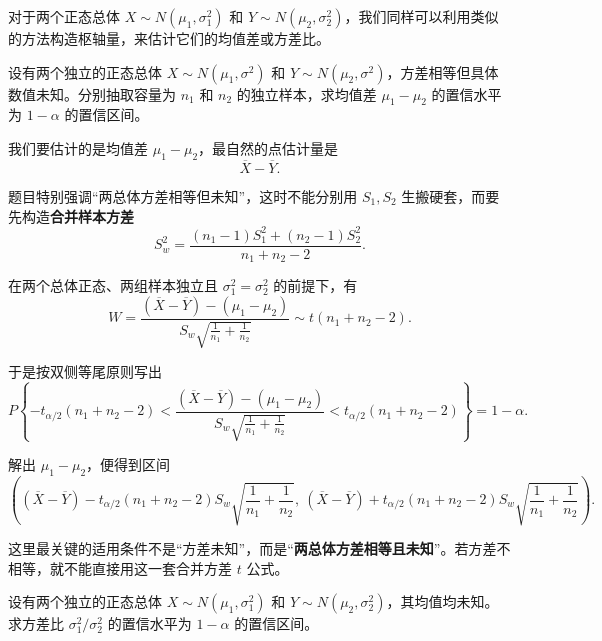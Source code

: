﻿\documentclass[lang=cn,11pt]{elegantbook}
\begin{document}
对于两个正态总体 $X \sim N(\mu_1, \sigma_1^2)$ 和 $Y \sim N(\mu_2, \sigma_2^2)$，我们同样可以利用类似的方法构造枢轴量，来估计它们的均值差或方差比。

\begin{exercise} \label{ex:ci_diff_mu_unknown_var}
设有两个独立的正态总体 $X \sim N(\mu_1, \sigma^2)$ 和 $Y \sim N(\mu_2, \sigma^2)$，方差相等但具体数值未知。分别抽取容量为 $n_1$ 和 $n_2$ 的独立样本，求均值差 $\mu_1-\mu_2$ 的置信水平为 $1-\alpha$ 的置信区间。
\end{exercise}

\begin{solution}
我们要估计的是均值差 \(\mu_1-\mu_2\)，最自然的点估计量是
\[
\overline{X}-\overline{Y}.
\]

题目特别强调“两总体方差相等但未知”，这时不能分别用 \(S_1,S_2\) 生搬硬套，而要先构造\textbf{合并样本方差}
\[
S_w^2=\frac{(n_1-1)S_1^2+(n_2-1)S_2^2}{n_1+n_2-2}.
\]

在两个总体正态、两组样本独立且 \(\sigma_1^2=\sigma_2^2\) 的前提下，有
\[
W=\frac{(\overline{X}-\overline{Y})-(\mu_1-\mu_2)}{S_w\sqrt{\frac{1}{n_1}+\frac{1}{n_2}}}\sim t(n_1+n_2-2).
\]

于是按双侧等尾原则写出
\[
P\left\{-t_{\alpha/2}(n_1+n_2-2)<\frac{(\overline{X}-\overline{Y})-(\mu_1-\mu_2)}{S_w\sqrt{\frac{1}{n_1}+\frac{1}{n_2}}}<t_{\alpha/2}(n_1+n_2-2)\right\}=1-\alpha.
\]

解出 \(\mu_1-\mu_2\)，便得到区间
\[
\left((\overline{X}-\overline{Y})-t_{\alpha/2}(n_1+n_2-2)S_w\sqrt{\frac{1}{n_1}+\frac{1}{n_2}},\ 
(\overline{X}-\overline{Y})+t_{\alpha/2}(n_1+n_2-2)S_w\sqrt{\frac{1}{n_1}+\frac{1}{n_2}}\right).
\]

\begin{note}
这里最关键的适用条件不是“方差未知”，而是“\textbf{两总体方差相等且未知}”。若方差不相等，就不能直接用这一套合并方差 \(t\) 公式。
\end{note}
\end{solution}

\begin{exercise} \label{ex:ci_ratio_var_unknown_mu}
设有两个独立的正态总体 $X \sim N(\mu_1, \sigma_1^2)$ 和 $Y \sim N(\mu_2, \sigma_2^2)$，其均值均未知。求方差比 $\sigma_1^2/\sigma_2^2$ 的置信水平为 $1-\alpha$ 的置信区间。
\end{exercise}
\end{document}
